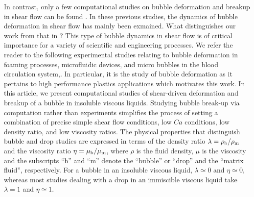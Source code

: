 \documentclass[%
 reprint,
 showkeys,
 amsmath,amssymb,
 aps,
 prfluids,
 onecolumn
]{revtex4-2}
\begin{document}
{\color{red} In contrast, only a few computational studies on bubble deformation and breakup in
shear flow can be found \cite{WeiQiaXu12,WanShiZha15}. 
In these previous studies, the dynamics of bubble 
deformation in shear flow has mainly been exmained.}
{\color{blue} What distinguishes our work from that in 
\cite{WeiQiaXu12,WanShiZha15}?}
This type of bubble dynamics in shear flow is of critical importance for a variety of
scientific and engineering processes. We refer the reader to the 
following experimental studies relating to bubble deformation in foaming
processes, microfluidic devices, and micro bubbles in the blood 
circulation system,\cite{ChuFinBouAtaHamPug19,MulTobDreFisWin08,BenRodFauPinFerPerGarMirLim18,DreSai15}.
In particular, it is the study of bubble deformation as it pertains
to high performance plastics applications which motivates this work.  
In this article, we present
computational studies of shear-driven deformation and breakup of a bubble in
insoluble viscous liquids.  
Studying bubble break-up via computation rather
than experiments simplifies the process of setting a combination of
precise simple shear flow conditions, low $Ca$ conditions, low density ratio, 
and low viscosity ratios.
The physical properties that distinguish bubble and
drop studies are expressed in terms of the density ratio $\lambda = \rho_{\rm b} /
\rho_{\rm m}$ and the viscosity ratio $\eta = \mu_{\rm b} / \mu_{\rm m}$, where $\rho$ is the
fluid density, $\mu$ is the viscosity and the subscripts ``b'' and ``m'' denote
the ``bubble'' or ``drop'' and the ``matrix fluid'', respectively.  For a
bubble in an insoluble viscous liquid, $\lambda \simeq 0$ and $\eta \simeq 0$, 
whereas most studies dealing with a drop
in an immiscible viscous liquid take $\lambda =1$ and $\eta \simeq 1$.  
\end{document}
